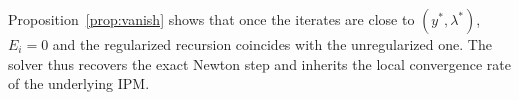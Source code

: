 \documentclass[class=scrbook, crop=false]{standalone}
\begin{document}
Proposition~\ref{prop:vanish} shows that 
once the iterates are close to $(y^*,\lambda^*)$, $E_i=0$ and the regularized recursion coincides with the unregularized one.
The solver thus recovers the exact Newton step and inherits the local convergence rate of the underlying \gls{IPM}.

%
\end{document}
